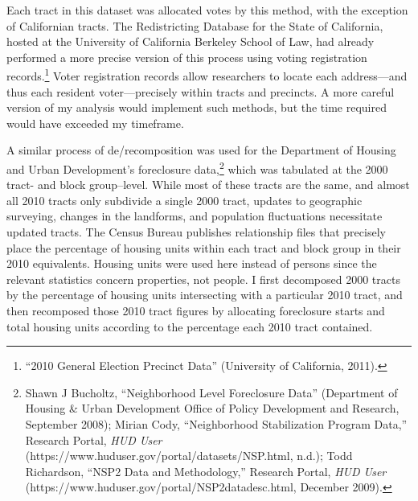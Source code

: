 \documentclass[12pt,oneside]{psthesis}
\begin{document}
Each tract in this dataset was allocated votes by this method, with the exception of Californian tracts.
The Redistricting Database for the State of California, hosted at the University of California Berkeley School of Law, had already performed a more precise version of this process using voting registration records.\footnote{``2010 General Election Precinct Data'' (University of California, 2011).}
Voter registration records allow researchers to locate each address---and thus each resident voter---precisely within tracts and precincts.
A more careful version of my analysis would implement such methods, but the time required would have exceeded my timeframe.

A similar process of de/recomposition was used for the Department of Housing and Urban Development's foreclosure data,\footnote{Shawn J Bucholtz, ``Neighborhood Level Foreclosure Data'' (Department of Housing \& Urban Development Office of Policy Development and Research, September 2008); Mirian Cody, ``Neighborhood Stabilization Program Data,'' Research Portal, \emph{HUD User} (https://www.huduser.gov/portal/datasets/NSP.html, n.d.); Todd Richardson, ``NSP2 Data and Methodology,'' Research Portal, \emph{HUD User} (https://www.huduser.gov/portal/NSP2datadesc.html, December 2009).} which was tabulated at the 2000 tract- and block group--level.
While most of these tracts are the same, and almost all 2010 tracts only subdivide a single 2000 tract, updates to geographic surveying, changes in the landforms, and population fluctuations necessitate updated tracts.
The Census Bureau publishes relationship files that precisely place the percentage of housing units within each tract and block group in their 2010 equivalents.
Housing units were used here instead of persons since the relevant statistics concern properties, not people.
I first decomposed 2000 tracts by the percentage of housing units intersecting with a particular 2010 tract, and then recomposed those 2010 tract figures by allocating foreclosure starts and total housing units according to the percentage each 2010 tract contained.
\end{document}
